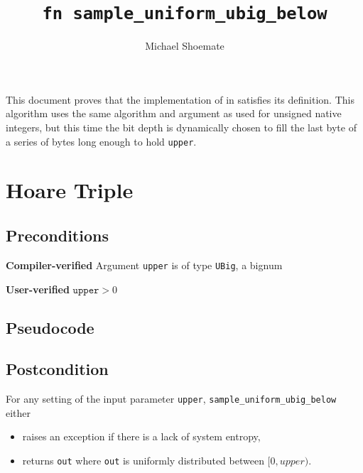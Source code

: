 \documentclass{article}
\title{\texttt{fn sample\_uniform\_ubig\_below}}
\author{Michael Shoemate}
\begin{document}
 
\maketitle 
 
This document proves that the implementation of  in   
satisfies its definition. 
This algorithm uses the same algorithm and argument as used for unsigned native integers,  
but this time the bit depth is dynamically chosen to fill the last byte of a series of bytes long enough to hold \texttt{upper}. 
 
\section{Hoare Triple} 
\subsection*{Preconditions} 
 
\textbf{Compiler-verified} 
Argument \texttt{upper} is of type \texttt{UBig}, a bignum 
 
\textbf{User-verified} 
$\texttt{upper} > 0$ 
 
\subsection*{Pseudocode} 
 
 
 
\subsection*{Postcondition} 
For any setting of the input parameter \texttt{upper}, 
\texttt{sample\_uniform\_ubig\_below} either 
\begin{itemize} 
    \item raises an exception if there is a lack of system entropy, 
    \item returns \texttt{out} where \texttt{out} is uniformly distributed between $[0, upper)$. 
\end{itemize} 
 
\end{document}
